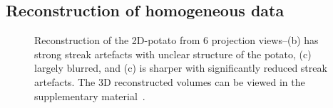 \documentclass[journal]{IEEEtran}
\begin{document}
\subsection{Reconstruction of homogeneous data}
\label{Sec:potato}
\begin{figure}[!h]
\centering
{}
\caption{Reconstruction of the 2D-potato from 6 projection views--(b) has strong streak artefacts with unclear structure of the potato, (c) largely blurred, and (c) is sharper with significantly reduced streak artefacts. The 3D reconstructed volumes can be viewed in the supplementary material~\cite{supp_paper}.}
\label{fig:potato_3D_results_A}
\end{figure}
\end{document}
